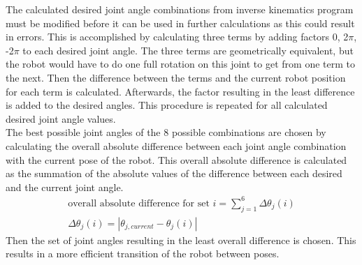 \documentclass[conference]{IEEEtran}
\begin{document}
The calculated desired joint angle combinations from inverse kinematics program must be modified before it can be used in further calculations as this could result in errors. This is accomplished by calculating three terms by adding factors 0, 2$\pi$, -2$\pi$ to each desired joint angle. The three terms are geometrically equivalent, but the robot would have to do one full rotation on this joint to get from one term to the next. Then the difference between the terms and the current robot position for each term is calculated. Afterwards, the factor resulting in the least difference is added to the desired angles. This procedure is repeated for all calculated desired joint angle values. \\
The best possible joint angles of the 8 possible combinations are chosen by calculating the overall absolute difference between each joint angle combination with the current pose of the robot. This overall absolute difference is calculated as the summation of the absolute values of the difference between each desired and the current joint angle. 
\begin{align*}
\mathrm{overall\,\,absolute\,\,difference\,\,for\,\,set} \,\, i = \sum\limits_{j=1}^6 \Delta\theta_j(i)\\
\Delta\theta_j(i) = \left| \theta_{j,current}-\theta_j(i) \right|
\end{align*}
Then the set of joint angles resulting in the least overall difference is chosen. This results in a more efficient transition of the robot between poses. 
\end{document}
